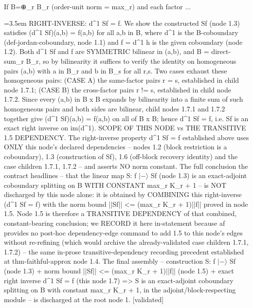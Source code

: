 \documentclass{article}
\newcommand{\step}[1]{\par\noindent\hangindent=3.5em\hangafter=1%
  \makebox[3.5em][l]{\textbf{#1.}}}
\newcommand{\steptag}[1]{\hfill{\small\textsf{[#1]}}}
\begin{document}
\begin{proofbox}{If B=⊕\_r B\_r (order-unit norm = max\_r) and each factor ...}
\step{1.7} RIGHT-INVERSE: d\textasciicircum{}1 Sf = f. We show the constructed Sf (node 1.3) satisfies (d\textasciicircum{}1 Sf)(a,b) = f(a,b) for all a,b in B, where d\textasciicircum{}1 is the B-coboundary (def-jordan-coboundary, node 1.1) and f = d\textasciicircum{}1 h is the given coboundary (node 1.2). Both d\textasciicircum{}1 Sf and f are SYMMETRIC bilinear in (a,b), and B = direct-sum\_r B\_r, so by bilinearity it suffices to verify the identity on homogeneous pairs (a,b) with a in B\_r and b in B\_s for all r,s. Two cases exhaust these homogeneous pairs: (CASE A) the same-factor pairs r = s, established in child node 1.7.1; (CASE B) the cross-factor pairs r != s, established in child node 1.7.2. Since every (a,b) in B x B expands by bilinearity into a finite sum of such homogeneous pairs and both sides are bilinear, child nodes 1.7.1 and 1.7.2 together give (d\textasciicircum{}1 Sf)(a,b) = f(a,b) on all of B x B; hence d\textasciicircum{}1 Sf = f, i.e. Sf is an exact right inverse on im(d\textasciicircum{}1). SCOPE OF THIS NODE vs THE TRANSITIVE 1.5 DEPENDENCY. The right-inverse property d\textasciicircum{}1 Sf = f established above uses ONLY this node's declared dependencies -- nodes 1.2 (block restriction is a coboundary), 1.3 (construction of Sf), 1.6 (off-block recovery identity) and the case children 1.7.1, 1.7.2 -- and asserts NO norm constant. The full conclusion the contract headlines -- that the linear map S: f $|-\rangle$ Sf (node 1.3) is an exact-adjoint coboundary splitting on B WITH CONSTANT max\_r K\_r + 1 -- is NOT discharged by this node alone: it is obtained by COMBINING this right-inverse (d\textasciicircum{}1 Sf = f) with the norm bound ||Sf|| <= (max\_r K\_r + 1)||f|| proved in node 1.5. Node 1.5 is therefore a TRANSITIVE DEPENDENCY of that combined, constant-bearing conclusion; we RECORD it here in-statement because af provides no post-hoc dependency-edge command to add 1.5 to this node's edges without re-refining (which would archive the already-validated case children 1.7.1, 1.7.2) -- the same in-prose transitive-dependency recording precedent established at thm-faithful-approx node 1.4. The final assembly -- construction S: f $|-\rangle$ Sf (node 1.3) + norm bound ||Sf|| <= (max\_r K\_r + 1)||f|| (node 1.5) + exact right inverse d\textasciicircum{}1 Sf = f (this node 1.7) => S is an exact-adjoint coboundary splitting on B with constant max\_r K\_r + 1, in the adjoint/block-respecting module -- is discharged at the root node 1. \steptag{validated} \\[6pt]

\end{proofbox}
\end{document}
